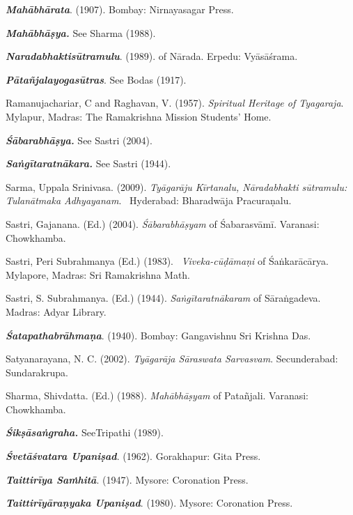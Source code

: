 \begin{thebibliography}{99}
  \textbf{\textit{Mahābhārata}}. (1907). Bombay: Nirnayasagar Press. 

  \textbf{\textit{Mahābhāṣya.}} See Sharma (1988).

  \textbf{\textit{Naradabhaktisūtramulu}}. (1989). of Nārada. Erpedu: Vyāsāśrama.

  \textbf{\textit{Pātañjalayogasūtras}}. See Bodas (1917).

  Ramanujachariar, C and Raghavan, V. (1957). \textit{Spiritual Heritage of Tyagaraja}. Mylapur, Madras: The Ramakrishna Mission Students’ Home.

  \textbf{\textit{Śābarabhāṣya.}} See Sastri (2004).

  \textbf{\textit{Saṅgītaratnākara.}} See Sastri (1944).

  Sarma, Uppala Srinivasa. (2009). \textit{Tyāgarāju Kīrtanalu, Nāradabhakti sūtramulu: Tulanātmaka Adhyayanam}.  Hyderabad: Bharadwāja Pracuraṇalu.

  Sastri, Gajanana. (Ed.) (2004). \textit{Śābarabhāṣyam} of Śabarasvāmī. Varanasi: Chowkhamba.

  Sastri, Peri Subrahmanya (Ed.) (1983).  \textit{Viveka-cūḍāmaṇi} of Śaṅkarācārya. Mylapore, Madras: Sri Ramakrishna Math.

  Sastri, S. Subrahmanya. (Ed.) (1944). \textit{Saṅgītaratnākaram} of Sāraṅgadeva. Madras: Adyar Library. 

  \textbf{\textit{Śatapathabrāhmaṇa}}. (1940). Bombay: Gangavishnu Sri Krishna Das.

  Satyanarayana, N. C. (2002). \textit{Tyāgarāja Sāraswata Sarvasvam}. Secunderabad: Sundarakrupa. 

  Sharma, Shivdatta. (Ed.) (1988). \textit{Mahābhāṣyam} of Patañjali. Varanasi: Chowkhamba.

  \textbf{\textit{Śikṣāsaṅgraha.}} SeeTripathi (1989).

  \textbf{\textit{Śvetāśvatara Upaniṣad}}. (1962). Gorakhapur: Gita Press.

  \textbf{\textit{Taittirīya Saṁhitā}}. (1947). Mysore: Coronation Press.

  \textbf{\textit{Taittirīyāraṇyaka Upaniṣad}}. (1980). Mysore: Coronation Press. 


\end{thebibliography}
